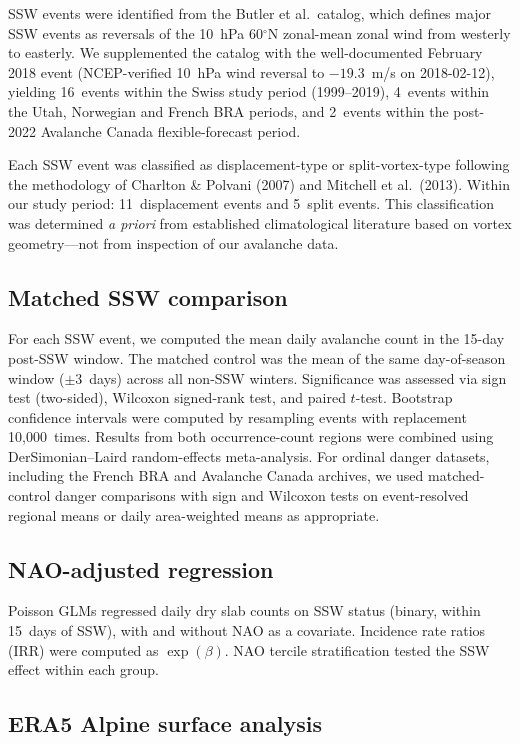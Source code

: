 \documentclass[11pt,letterpaper]{article}
\begin{document}
SSW events were identified from the Butler et al.\ catalog, which defines major SSW events as reversals of the 10~hPa 60$^\circ$N zonal-mean zonal wind from westerly to easterly. We supplemented the catalog with the well-documented February 2018 event (NCEP-verified 10~hPa wind reversal to $-19.3$~m/s on 2018-02-12), yielding 16~events within the Swiss study period (1999--2019), 4~events within the Utah, Norwegian and French BRA periods, and 2~events within the post-2022 Avalanche Canada flexible-forecast period.

Each SSW event was classified as displacement-type or split-vortex-type following the methodology of Charlton \& Polvani (2007) and Mitchell et al.\ (2013). Within our study period: 11~displacement events and 5~split events. This classification was determined \textit{a priori} from established climatological literature based on vortex geometry---not from inspection of our avalanche data.

\subsection{Matched SSW comparison}

For each SSW event, we computed the mean daily avalanche count in the 15-day post-SSW window. The matched control was the mean of the same day-of-season window ($\pm 3$~days) across all non-SSW winters. Significance was assessed via sign test (two-sided), Wilcoxon signed-rank test, and paired $t$-test. Bootstrap confidence intervals were computed by resampling events with replacement 10,000~times. Results from both occurrence-count regions were combined using DerSimonian--Laird random-effects meta-analysis. For ordinal danger datasets, including the French BRA and Avalanche Canada archives, we used matched-control danger comparisons with sign and Wilcoxon tests on event-resolved regional means or daily area-weighted means as appropriate.

\subsection{NAO-adjusted regression}

Poisson GLMs regressed daily dry slab counts on SSW status (binary, within 15~days of SSW), with and without NAO as a covariate. Incidence rate ratios (IRR) were computed as $\exp(\beta)$. NAO tercile stratification tested the SSW effect within each group.

\subsection{ERA5 Alpine surface analysis}
\end{document}
